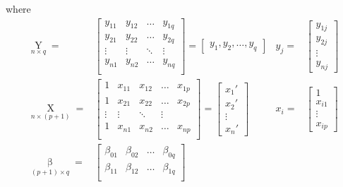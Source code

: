     where 
\begin{subequations}\label{EqaSampleNotationOfMultiLinear}
    \begin{align}
        \mathop{Y}\limits_{n\times q} =&\begin{bmatrix}
        y_{11}&y_{12}&\ldots&y_{1q}\\
        y_{21}&y_{22}&\ldots&y_{2q}\\
        \vdots&\vdots&\ddots&\vdots\\
        y_{n1}&y_{n2}&\ldots&y_{nq}\\
        \end{bmatrix}
        =\begin{bmatrix}
            y_1,y_2,\ldots,y_q
        \end{bmatrix}
        &
        y _j=&\begin{bmatrix}
                y _{1j}\\
                y _{2j}\\
                \vdots\\
                y _{nj}
            \end{bmatrix}\\
        \mathop{X}\limits_{n\times (p+1)}=&\begin{bmatrix}
        1&x_{11}&x_{12}&\ldots&x_{1p}\\
        1&x_{21}&x_{22}&\ldots&x_{2p}\\
        \vdots&\vdots&\ddots&\vdots\\
        1&x_{n1}&x_{n2}&\ldots&x_{np}\\
        \end{bmatrix}
        =
        \begin{bmatrix}
        x_1'\\x_2'\\\vdots\\x_n'   
        \end{bmatrix} 
        &
        x_i=&\begin{bmatrix}
            1\\
            x_{i1}\\
            \vdots\\
            x_{ip}
        \end{bmatrix}\\
        \mathop{\beta }\limits_{(p+1)\times q}=&\begin{bmatrix}
        \beta _{01}&\beta _{02}&\ldots&\beta _{0q}\\
        \beta _{11}&\beta _{12}&\ldots&\beta _{1q}\\

\end{bmatrix}
\end{align}
\end{subequations}
